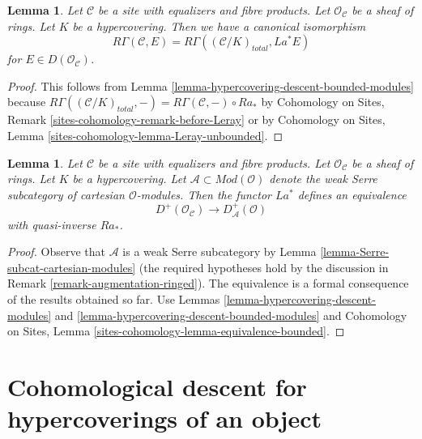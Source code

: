 \documentclass{stacks-project}
\theoremstyle{plain}
\newtheorem{lemma}[subsection]{Lemma}
\theoremstyle{definition}
\theoremstyle{remark}
\numberwithin{equation}{subsection}
\begin{document}
\begin{lemma}
\label{lemma-compare-cohomology-hypercovering-modules}
Let $\mathcal{C}$ be a site with equalizers and fibre products.
Let $\mathcal{O}_\mathcal{C}$ be a sheaf of rings.
Let $K$ be a hypercovering.
Then we have a canonical isomorphism
$$
R\Gamma(\mathcal{C}, E) =
R\Gamma((\mathcal{C}/K)_{total}, La^*E)
$$
for $E \in D(\mathcal{O}_\mathcal{C})$.
\end{lemma}

\begin{proof}
This follows from Lemma \ref{lemma-hypercovering-descent-bounded-modules}
because $R\Gamma((\mathcal{C}/K)_{total}, -) =
R\Gamma(\mathcal{C}, -) \circ Ra_*$ by
Cohomology on Sites, Remark \ref{sites-cohomology-remark-before-Leray}
or by
Cohomology on Sites, Lemma \ref{sites-cohomology-lemma-Leray-unbounded}.
\end{proof}

\begin{lemma}
\label{lemma-hypercovering-equivalence-bounded-modules}
Let $\mathcal{C}$ be a site with equalizers and fibre products.
Let $\mathcal{O}_\mathcal{C}$ be a sheaf of rings.
Let $K$ be a hypercovering.
Let $\mathcal{A} \subset \textit{Mod}(\mathcal{O})$
denote the weak Serre subcategory of cartesian $\mathcal{O}$-modules.
Then the functor $La^*$ defines an equivalence
$$
D^+(\mathcal{O}_\mathcal{C}) \longrightarrow D_\mathcal{A}^+(\mathcal{O})
$$
with quasi-inverse $Ra_*$.
\end{lemma}

\begin{proof}
Observe that $\mathcal{A}$ is a weak Serre subcategory by
Lemma \ref{lemma-Serre-subcat-cartesian-modules}
(the required hypotheses hold by the discussion in
Remark \ref{remark-augmentation-ringed}).
The equivalence is a
formal consequence of the results obtained so far. Use
Lemmas \ref{lemma-hypercovering-descent-modules} and
\ref{lemma-hypercovering-descent-bounded-modules} and
Cohomology on Sites, Lemma \ref{sites-cohomology-lemma-equivalence-bounded}.
\end{proof}






\section{Cohomological descent for hypercoverings of an object}
\label{section-cohomological-descent-hypercoverings-X}
\end{document}
